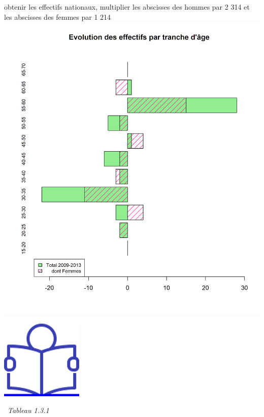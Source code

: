 obtenir les effectifs nationaux, multiplier les abscisses des hommes par
2 314 et les abscisses des femmes par 1 214\newpage
\includegraphics{altair_files/figure-latex/unnamed-chunk-17-3.png}

\href{../Docs/Notices/fiche_3.odt}{\includegraphics{icones/Notice.png}}

\newpage

~\emph{Tableau 1.3.1}

